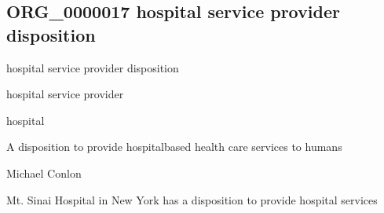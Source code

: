 \documentclass[letterpaper,10pt,english]{sphinxmanual}
\begin{document}
\subsection{ORG\_0000017 \sphinxhyphen{} hospital service provider disposition}
\label{\detokenize{doc-ORG_0000017:org-0000017-hospital-service-provider-disposition}}\label{\detokenize{doc-ORG_0000017:index-0}}\label{\detokenize{doc-ORG_0000017::doc}}
\begin{sphinxShadowBox}

\sphinxAtStartPar
hospital service provider disposition
\end{sphinxShadowBox}

\begin{sphinxShadowBox}

\sphinxAtStartPar
hospital service provider
\end{sphinxShadowBox}

\begin{sphinxShadowBox}

\sphinxAtStartPar
hospital
\end{sphinxShadowBox}

\begin{sphinxShadowBox}

\sphinxAtStartPar
{\hyperref[\detokenize{doc-ORG_0000010::doc}]{}}
\end{sphinxShadowBox}

\begin{sphinxShadowBox}

\sphinxAtStartPar
A disposition to provide hospital\sphinxhyphen{}based health care services to humans
\end{sphinxShadowBox}

\begin{sphinxShadowBox}

\sphinxAtStartPar
Michael Conlon 
\end{sphinxShadowBox}

\begin{sphinxShadowBox}

\sphinxAtStartPar
Mt. Sinai Hospital in New York has a disposition to provide hospital services
\end{sphinxShadowBox}
\end{document}
